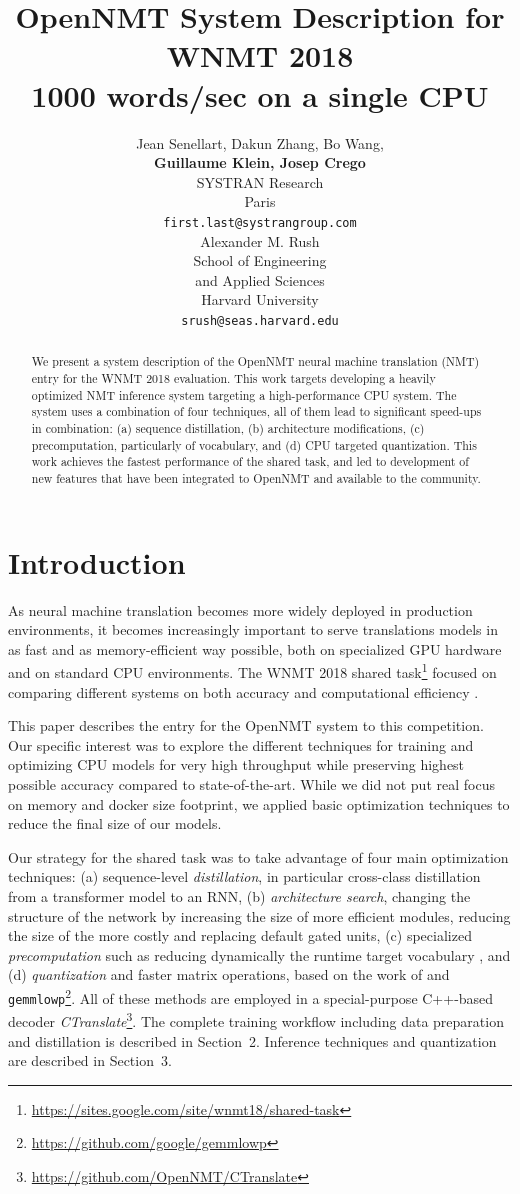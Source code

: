 \documentclass[11pt,a4paper]{article}
\title{OpenNMT System Description for WNMT 2018 \protect\\ 1000 words/sec on a single CPU}
\author{Jean Senellart, Dakun Zhang, Bo Wang,\\{\bf Guillaume Klein, Josep Crego}\\
  SYSTRAN Research\\
  Paris \\
  {\tt first.last@systrangroup.com} \\\And
  Alexander M. Rush\\
  School of Engineering \\
  and Applied Sciences \\
  Harvard University \\
  {\tt srush@seas.harvard.edu} \\}
\date{}
\begin{document}
\maketitle
\begin{abstract}

  We present a system description of the OpenNMT neural machine translation (NMT) entry for the WNMT 2018 evaluation.
  This work
  targets developing a heavily optimized NMT inference system
  targeting a high-performance CPU system. The system uses a
  combination of four techniques, all of them lead to significant
  speed-ups in combination: (a) sequence distillation, (b)
  architecture modifications, (c) precomputation, particularly of
  vocabulary, and (d) CPU targeted quantization. This work achieves the fastest performance of the shared task, and led to development of new features that have been integrated to OpenNMT and
  available to the community.

\end{abstract}

\section{Introduction}

As neural machine translation becomes more widely deployed in
production environments, it becomes increasingly important to serve
translations models in as fast and as memory-efficient way possible,
both on specialized GPU hardware and on standard CPU environments. The
WNMT 2018 shared task\footnote{\url{https://sites.google.com/site/wnmt18/shared-task}}
focused on comparing different systems on both accuracy and
computational efficiency \cite{birch2018wnmt}.

This paper describes the entry for the OpenNMT system to this
competition.  Our specific interest was to explore the different
techniques for training and optimizing CPU models for very high throughput
while preserving highest possible accuracy compared to state-of-the-art. While we did not put real focus
on memory and docker size footprint, we applied basic optimization
techniques to reduce the final size of our models.

Our strategy for the shared task was to take advantage of four main
optimization techniques: (a) sequence-level \textit{distillation}, in
particular cross-class distillation from a transformer model
\cite{vaswani2017attention} to an RNN, (b) \textit{architecture
  search}, changing the structure of the network by increasing the
size of more efficient modules, reducing the size of the more costly
and replacing default gated units,  (c)
specialized \textit{precomputation} such as reducing dynamically the
runtime target vocabulary \cite{shi2017speeding}, and (d) \textit{quantization} and
faster matrix operations, based on the work of
 and {\tt
  gemmlowp}\footnote{\url{https://github.com/google/gemmlowp}}. All of these
methods are employed in a special-purpose C++-based decoder
\textit{CTranslate}\footnote{\url{https://github.com/OpenNMT/CTranslate}}.
The complete training workflow including data preparation and
distillation is described in Section~2. Inference techniques and quantization are
described in Section~3.
\end{document}
